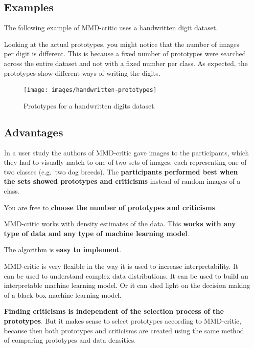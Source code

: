 \documentclass[12pt,]{krantz}
\begin{document}
\subsection{Examples}\label{examples-3}

The following example of MMD-critic uses a handwritten digit dataset.

Looking at the actual prototypes, you might notice that the number of
images per digit is different. This is because a fixed number of
prototypes were searched across the entire dataset and not with a fixed
number per class. As expected, the prototypes show different ways of
writing the digits.

\begin{figure}

{\centering \texttt{[image: images/handwritten-prototypes]} 

}

\caption{Prototypes for a handwritten digits dataset.}\label{fig:prototypes-and-criticisms2}
\end{figure}

\subsection{Advantages}\label{advantages-11}

In a user study the authors of MMD-critic gave images to the
participants, which they had to visually match to one of two sets of
images, each representing one of two classes (e.g.~two dog breeds). The
\textbf{participants performed best when the sets showed prototypes and
criticisms} instead of random images of a class.

You are free to \textbf{choose the number of prototypes and criticisms}.

MMD-critic works with density estimates of the data. This \textbf{works
with any type of data and any type of machine learning model}.

The algorithm is \textbf{easy to implement}.

MMD-critic is very flexible in the way it is used to increase
interpretability. It can be used to understand complex data
distributions. It can be used to build an interpretable machine learning
model. Or it can shed light on the decision making of a black box
machine learning model.

\textbf{Finding criticisms is independent of the selection process of
the prototypes}. But it makes sense to select prototypes according to
MMD-critic, because then both prototypes and criticisms are created
using the same method of comparing prototypes and data densities.
\end{document}
